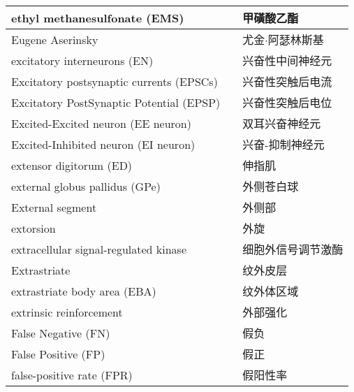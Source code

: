 \begin{longtable}{lll}
	\midrule
	ethyl methanesulfonate (EMS)    &&  甲磺酸乙酯  \\
	
	\midrule
	Eugene Aserinsky    &&  尤金$\cdot$阿瑟林斯基  \\
	
	\midrule
	excitatory interneurons  (EN)  &&  兴奋性中间神经元  \\
	
	\midrule
	Excitatory postsynaptic currents (EPSCs)     &&  兴奋性突触后电流  \\
	
	\midrule
	Excitatory PostSynaptic Potential (EPSP)     &&  兴奋性突触后电位  \\
	
	\midrule
	Excited-Excited neuron (EE neuron)     &&  双耳兴奋神经元  \\
	
	\midrule
	Excited-Inhibited neuron (EI neuron)     && 兴奋-抑制神经元   \\
	
	\midrule
	extensor digitorum (ED)     && 伸指肌   \\
	
	\midrule
	external globus pallidus (GPe)     && 外侧苍白球   \\
	
	\midrule
	External segment     && 外侧部   \\
	
	\midrule
	extorsion     && 外旋   \\
	
	\midrule
	extracellular signal-regulated kinase     && 细胞外信号调节激酶   \\
	
	\midrule
	Extrastriate     && 纹外皮层   \\
	
	\midrule
	extrastriate body area  (EBA)   && 纹外体区域   \\
	
	\midrule
	extrinsic reinforcement   && 外部强化   \\
	
	\midrule
	False Negative (FN)    &&  假负  \\
	
	\midrule
	False Positive (FP)    &&  假正  \\
	
	\midrule
	false-positive rate (FPR)    &&  假阳性率  \\
	

\end{longtable}
